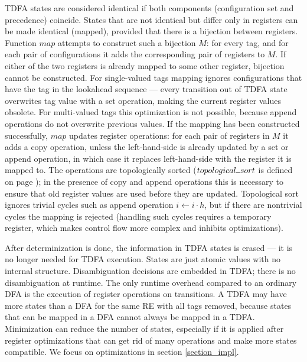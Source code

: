 \documentclass[]{article}
\newcommand{\Xund}{\rule{.5em}{.5pt}}
\begin{document}
TDFA states are considered identical if both components (configuration set and precedence) coincide.
States that are not identical but differ only in registers can be made identical (mapped), provided that there is a bijection between registers.
Function $map$ attempts to construct such a bijection $M$:
for every tag, and for each pair of configurations
it adds the corresponding pair of registers to $M$.
If either of the two registers is already mapped to some other register, bijection cannot be constructed.
For single-valued tags mapping ignores configurations that have the tag in the lookahead sequence ---
every transition out of TDFA state overwrites tag value with a set operation, making the current register values obsolete.
For multi-valued tags this optimization is not possible, because append operations do not overwrite previous values.
If the mapping has been constructed successfully, $map$ updates register operations:
for each pair of registers in $M$ it adds a copy operation,
unless the left-hand-side is already updated by a set or append operation,
in which case it replaces left-hand-side with the register it is mapped to.
The operations are topologically sorted ($topological \Xund sort$ is defined on page \pageref{alg_opt2});
in the presence of copy and append operations this is necessary to ensure that old register values are used before they are updated.
Topological sort ignores trivial cycles such as append operation $i \leftarrow i \cdot h$,
but if there are nontrivial cycles the mapping is rejected
(handling such cycles requires a temporary register, which makes control flow more complex and inhibits optimizations).
\medskip

After determinization is done, the information in TDFA states is erased --- it is no longer needed for TDFA execution.
States are just atomic values with no internal structure.
Disambiguation decisions are embedded in TDFA; there is no disambiguation at runtime.
The only runtime overhead compared to an ordinary DFA is the execution of register operations on transitions.
A TDFA may have more states than a DFA for the same RE with all tags removed, because states that can be mapped in a DFA cannot always be mapped in a TDFA.
Minimization can reduce the number of states,
especially if it is applied after register optimizations that can get rid of many operations and make more states compatible.
We focus on optimizations in section \ref{section_impl}.
\medskip
\end{document}
